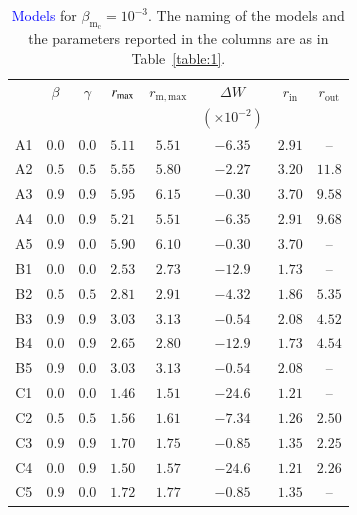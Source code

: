 \documentclass{aa}
\newcommand{\sg}[1]{\textcolor{blue}{#1}}
\begin{document}
\begin{table}
\caption{\sg{Models} for $\beta_{\mathrm{m}_{\mathrm{c}}} = 10^{-3}$. The naming of the models and the parameters reported in the columns are as in Table~\ref{table:1}.}             
\label{table:3}      
\centering          
\begin{tabular}{c c c c  c c c c}
\hline\hline       
 & $\beta$ & $\gamma$ & $r_{\rm{max}}$ &  $r_{\mathrm{m, max}}$ & $\Delta W$               & $r_{\mathrm{in}}$ & $r_{\mathrm{out}}$ \\ 
 &              &                   &                          &                                        & $(\times 10^{-2})$     &                              &  \\
\hline           
A1 & $0.0$ & $0.0$ & $5.11$ &  $5.51$  & $-6.35$ & $2.91$ & -- \\ 
A2 & $0.5$ & $0.5$ & $5.55$ &  $5.80$  & $-2.27$ & $3.20$ & $11.8$\\ 
A3 & $0.9$ & $0.9$ & $5.95$ &  $6.15$  & $-0.30$ & $3.70$ &  $9.58$\\ 
A4 & $0.0$ & $0.9$ & $5.21$ &  $5.51$  & $-6.35$ & $2.91$ & $9.68$\\  
A5 & $0.9$ & $0.0$ & $5.90$ &  $6.10$  & $-0.30$ & $3.70$ & --\\
 \hline 
B1 & $0.0$ & $0.0$ & $2.53$ &  $2.73$  & $-12.9$ & $1.73$ & -- \\ 
B2 & $0.5$ & $0.5$ & $2.81$ &  $2.91$  & $-4.32$ & $1.86$ & $5.35$\\
B3 & $0.9$ & $0.9$ & $3.03$ &  $3.13$  & $-0.54$ & $2.08$ & $4.52$\\  
B4 & $0.0$ & $0.9$ & $2.65$ &  $2.80$  & $-12.9$ & $1.73$ & $4.54$\\ 
B5 & $0.9$ & $0.0$ & $3.03$ &  $3.13$  & $-0.54$ & $2.08$ & -- \\  
 \hline 
C1 & $0.0$ & $0.0$ & $1.46$ &  $1.51$  & $-24.6$ & $1.21$ & -- \\ 
C2 & $0.5$ & $0.5$ & $1.56$ &  $1.61$  & $-7.34$ & $1.26$ & $2.50$\\ 
C3 & $0.9$ & $0.9$ & $1.70$ &  $1.75$  & $-0.85$ & $1.35$ & $2.25$\\ 
C4 & $0.0$ & $0.9$ & $1.50$ &  $1.57$  & $-24.6$ & $1.21$ & $2.26$\\ 
C5 & $0.9$ & $0.0$ & $1.72$ &  $1.77$  & $-0.85$ & $1.35$ & --\\ 
\hline      
\end{tabular}
\end{table}
\end{document}

